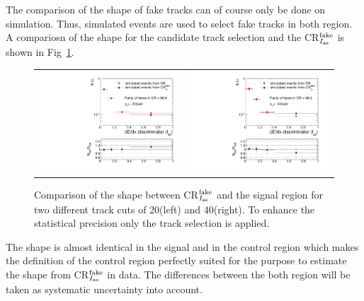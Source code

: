 The comparison of the \ias shape of fake tracks can of course only be done on simulation.
Thus, simulated \WJets events are used to select fake tracks in both region.
A compariosn of the shape for the candidate track selection and the CR$_{I_{\text{as}}}^{\text{fake}}$ is shown in Fig~\ref{fig:IasSRCRFakes}.
\begin{figure}[!t]
  \centering 
  \begin{tabular}{c}
    \includegraphics[width=0.49\textwidth]{figures/analysis/Background/hASmi_SRbinning_d0Inverted_fakes_ECalaoLe5_trackPtGt20_MC_CR_MC_SR.pdf}
    \includegraphics[width=0.49\textwidth]{figures/analysis/Background/hASmi_SRbinning_d0Inverted_fakes_ECalaoLe5_trackPtGt40_MC_CR_MC_SR.pdf}
  \end{tabular}
  \caption{Comparison of the \ias shape between CR$_{I_{\text{as}}}^{\text{fake}}$ and the signal region for two different track \pt cuts of 20\gev (left) and 40\gev (right). To enhance the statistical precision only the track selection is applied.}
  \label{fig:IasSRCRFakes}
\end{figure}

The \ias shape is almost identical in the signal and in the control region which makes the definition of the control region perfectly suited for the purpose to estimate the \ias shape from CR$_{I_{\text{as}}}^{\text{fake}}$ in data.
The differences between the both region will be taken as systematic uncertainty into account.

